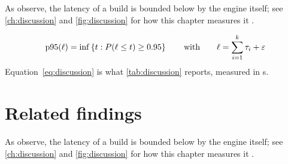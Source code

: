 As \textcite{lamport1994} observe, the latency \latency{} of a build is
bounded below by the engine itself; see \cref{ch:discussion} and \cref{fig:discussion}
for how this chapter measures it \parencite{knuth1984}.

\begin{equation}\label{eq:discussion}
  \operatorname{p95}(\ell) = \inf\left\{ t : P(\ell \le t) \ge 0.95 \right\}
  \qquad \text{with} \qquad \ell = \sum_{i=1}^{k} \tau_i + \varepsilon
\end{equation}
Equation~\eqref{eq:discussion} is what \cref{tab:discussion} reports, measured in \si{\second}.

\section{Related findings}\label{sec:discussion-3}
\lipsum[131-144]

As \textcite{knuth1984} observe, the latency \latency{} of a build is
bounded below by the engine itself; see \cref{ch:discussion} and \cref{fig:discussion}
for how this chapter measures it \parencite{shapiro2011}.

